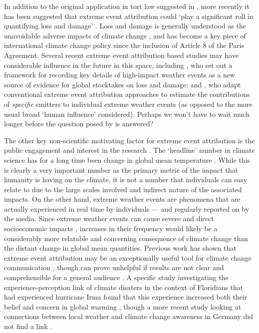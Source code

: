   In addition to the original application in tort law suggested in \citet{allen_liability_2003}, more recently it has been suggested that extreme event attribution could `play a significant roll in quantifying loss and damage' \citep{wehner_operational_2022}. Loss and damage is generally understood as the unavoidable adverse impacts of climate change \citep{mace_loss_2016}, and has become a key piece of international climate change policy since the inclusion of Article 8 of the Paris Agreement. Several recent extreme event attribution based studies may have considerable influence in the future in this space, including \citet{clarke_inventories_2021}, who set out a framework for recording key details of high-impact weather events as a new source of evidence for global stocktakes on loss and damage; and \citet{otto_assigning_2017,lott_quantifying_2021}, who adapt conventional extreme event attribution approaches to estimate the contributions of \emph{specific} emitters to individual extreme weather events (as opposed to the more usual broad `human influence' considered). Perhaps we won't have to wait much longer before the question posed by \citeauthor{allen_liability_2003} is answered?

  The other key non-scientific motivating factor for extreme event attribution is the public engagement and interest in the research  \citep{swain_attributing_2020}. The `headline' number in climate science has for a long time been change in global mean temperature \citep{stocker_climate_2013,ipcc_global_2018,masson-delmotte_climate_2021}. While this is clearly a very important number as the primary metric of the impact that humanity is having on the climate, it is not a number that individuals can easy relate to due to the large scales involved and indirect nature of the associated impacts. On the other hand, extreme weather events are phenomena that are actually experienced in real time by individuals --- and regularly reported on by the media. Since extreme weather events can cause severe and direct socioeconomic impacts \citep{fouillet_excess_2006}, increases in their frequency would likely be a considerably more relatable and concerning consequence of climate change than the distant change in global mean quantities. Previous work has shown that extreme event attribution may be an exceptionally useful tool for climate change communication \citep{ettinger_whats_2021}, though can prove unhelpful if results are not clear and comprehensible for a general audience \citep[for example if different attribution studies regarding a single event appear to provide conflicting headline results][]{osaka_natural_2020}. A specific study investigating the experience-perception link of climate disaters in the context of Floridians that had experienced hurricane Irma found that this experience increased both their belief and concern in global warming \citep{bergquist_experiencing_2019}, though a more recent study looking at connections between local weather and climate change awareness in Germany did not find a link \citep{gartner_experiencing_2021}.

